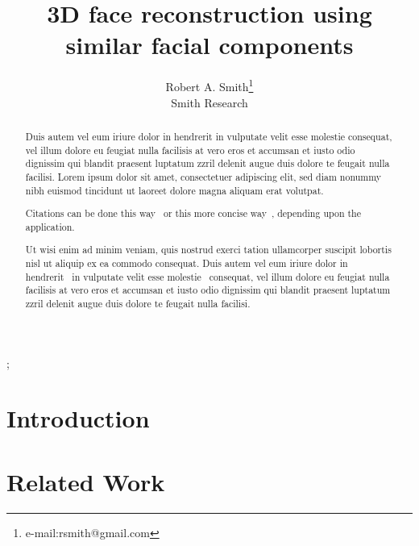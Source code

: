 \documentclass[annual]{acmsiggraph}
\title{3D face reconstruction using similar facial components}
\author{Robert A. Smith\thanks{e-mail:rsmith@gmail.com}\\Smith Research}
\begin{document}

\maketitle

\begin{abstract}

Duis autem vel eum iriure dolor in hendrerit in vulputate velit esse
molestie consequat, vel illum dolore eu feugiat nulla facilisis at 
vero eros et accumsan et iusto odio dignissim qui blandit praesent
luptatum zzril delenit augue duis dolore te feugait nulla
facilisi. Lorem ipsum dolor sit amet, consectetuer adipiscing elit,
sed diam nonummy nibh euismod tincidunt ut laoreet dolore magna
aliquam erat volutpat.

Citations can be done this way~\cite{Jobs95} or this more concise 
way~, depending upon the application.

Ut wisi enim ad minim veniam, quis nostrud exerci tation ullamcorper
suscipit lobortis nisl ut aliquip ex ea commodo consequat. Duis autem
vel eum iriure dolor in hendrerit~\cite{Pellacini:2005:LAH}
in vulputate velit esse molestie~\cite{notes2002} 
consequat, vel illum dolore eu feugiat nulla facilisis at vero eros et
accumsan et iusto odio dignissim qui blandit praesent luptatum zzril
delenit augue duis dolore te feugait nulla facilisi.~\cite{Park:2006:DSI}

\end{abstract}

\begin{CRcatlist}
  ;
\end{CRcatlist}

\keywordlist

\TOGlinkslist

\copyrightspace

\section{Introduction}



\section{Related Work}
\end{document}
